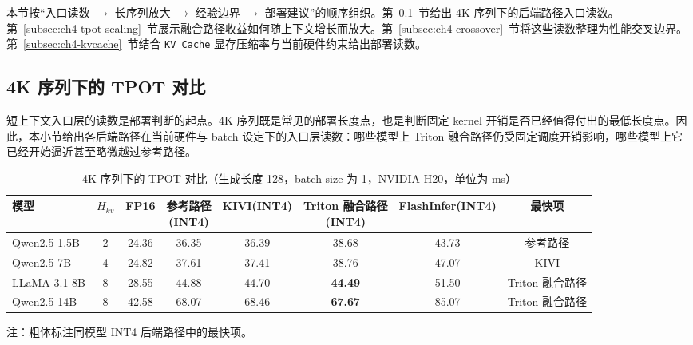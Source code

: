 本节按“入口读数 $\rightarrow$ 长序列放大 $\rightarrow$ 经验边界 $\rightarrow$ 部署建议”的顺序组织。第~\ref{subsec:ch4-tpot-4k}~节给出 4K 序列下的后端路径入口读数。第~\ref{subsec:ch4-tpot-scaling}~节展示融合路径收益如何随上下文增长而放大。第~\ref{subsec:ch4-crossover}~节将这些读数整理为性能交叉边界。第~\ref{subsec:ch4-kvcache}~节结合 \texttt{KV Cache} 显存压缩率与当前硬件约束给出部署读数。

\subsection{4K 序列下的 TPOT 对比}
\label{subsec:ch4-tpot-4k}

短上下文入口层的读数是部署判断的起点。4K 序列既是常见的部署长度点，也是判断固定 kernel 开销是否已经值得付出的最低长度点。因此，本小节给出各后端路径在当前硬件与 batch 设定下的入口层读数：哪些模型上 Triton 融合路径仍受固定调度开销影响，哪些模型上它已经开始逼近甚至略微越过参考路径。

\begin{table}[H]
  \centering
  \caption{4K 序列下的 TPOT 对比（生成长度 128，batch size 为 1，NVIDIA H20，单位为 ms）}
  \label{tab:ch4-tpot-4k}
  {%
  \footnotesize
  \setlength{\tabcolsep}{4pt}
  \renewcommand{\arraystretch}{1.05}
  \begin{tabular}{lccccccc}
    \toprule
    模型 & $H_{kv}$ & FP16 & \makecell[c]{参考路径\\(INT4)} & KIVI(INT4) & \makecell[c]{Triton 融合路径\\(INT4)} & FlashInfer(INT4) & 最快项 \\
    \midrule
    Qwen2.5-1.5B & 2 & 24.36 & 36.35 & 36.39 & 38.68 & 43.73 & 参考路径 \\
    Qwen2.5-7B   & 4 & 24.82 & 37.61 & 37.41 & 38.76 & 47.07 & KIVI \\
    LLaMA-3.1-8B & 8 & 28.55 & 44.88 & 44.70 & \textbf{44.49} & 51.50 & Triton 融合路径 \\
    Qwen2.5-14B  & 8 & 42.58 & 68.07 & 68.46 & \textbf{67.67} & 85.07 & Triton 融合路径 \\
    \bottomrule
  \end{tabular}

  \vspace{0.35em}
  \begin{minipage}{0.94\linewidth}
    \footnotesize
    注：粗体标注同模型 INT4 后端路径中的最快项。
  \end{minipage}
  }
\end{table}

